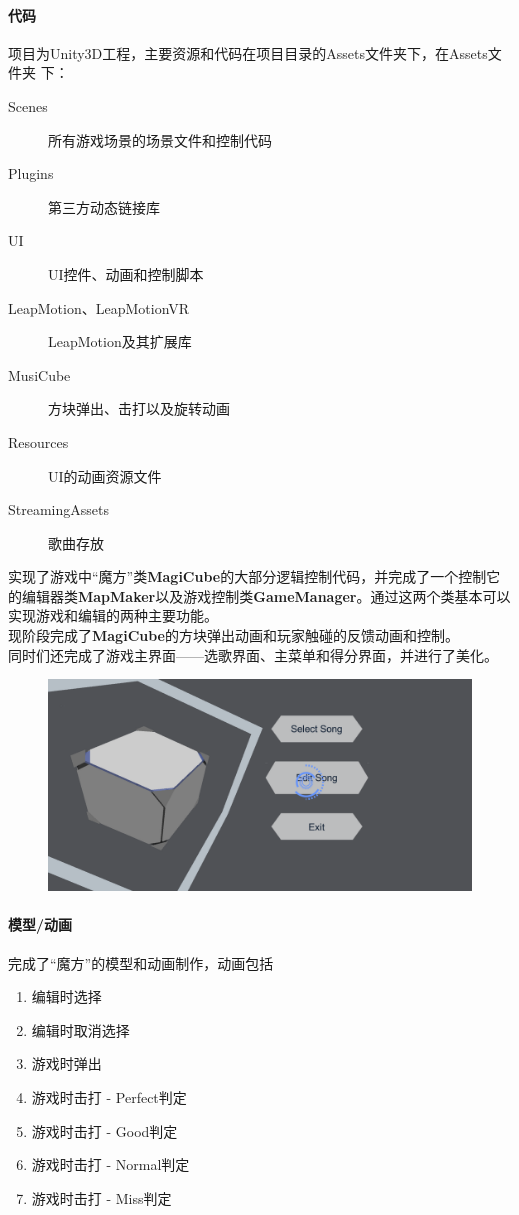 \documentclass{article}
\begin{document}
\paragraph{代码}
项目为Unity3D工程，主要资源和代码在项目目录的Assets文件夹下，在Assets文件夹
下：
\begin{description}
  \item[Scenes] 所有游戏场景的场景文件和控制代码
  \item[Plugins] 第三方动态链接库
  \item[UI] UI控件、动画和控制脚本
  \item[LeapMotion、LeapMotionVR] LeapMotion及其扩展库
  \item[MusiCube] 方块弹出、击打以及旋转动画
  \item[Resources] UI的动画资源文件
  \item[StreamingAssets] 歌曲存放
\end{description}
\newpage
实现了游戏中“魔方”类\textbf{MagiCube}的大部分逻辑控制代码，并完成了一个控制它的编辑器类\textbf{MapMaker}以及游戏控制类\textbf{GameManager}。通过这两个类基本可以实现游戏和编辑的两种主要功能。\\
现阶段完成了\textbf{MagiCube}的方块弹出动画和玩家触碰的反馈动画和控制。\\
同时们还完成了游戏主界面——选歌界面、主菜单和得分界面，并进行了美化。
\begin{figure}[H]
  \centering
  \includegraphics[width=40em]{mainMenu.png}\\
  \caption{}\label{}
\end{figure}
\paragraph{模型/动画}
完成了“魔方”的模型和动画制作，动画包括
\begin{enumerate}
  \item 编辑时选择
  \item 编辑时取消选择
  \item 游戏时弹出
  \item 游戏时击打 - Perfect判定
  \item 游戏时击打 - Good判定
  \item 游戏时击打 - Normal判定
  \item 游戏时击打 - Miss判定
\end{enumerate}
\end{document}
